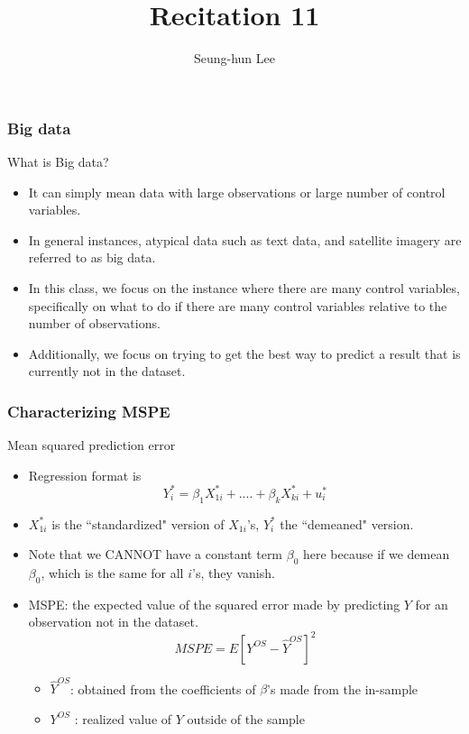 \documentclass[compress]{beamer}
\title[Recitation 11]{Recitation 11} %
\author[Seung-hun Lee]{Seung-hun Lee}
\institute[Columbia University]{Columbia University}
\date[]{}
\begin{document}
\begin{frame}
\titlepage
\end{frame}

\begin{frame}
\frametitle{Big data}
What is Big data?
\begin{itemize}
\item It can simply mean data with large observations or large number of control variables. 
\item In general instances, atypical data such as text data, and satellite imagery are referred to as big data. 
\item In this class, we focus on the instance where there are many control variables, specifically on what to do if there are many control variables relative to the number of observations. 
\item Additionally, we focus on trying to get the best way to predict a result that is currently not in the dataset.
\end{itemize}
\end{frame}

\begin{frame}
\frametitle{Characterizing MSPE}
Mean squared prediction error
\begin{itemize}
\item Regression format is 
\[
Y_{i}^*=\beta_1X_{1i}^*+....+\beta_kX_{ki}^*+u_i^*
\]
\item  $X_{1i}^*$ is the ``standardized" version of $X_{1i}$'s, $Y^*_i$ the ``demeaned" version.
\item  Note that we CANNOT have a constant term $\beta_0$ here because if we demean $\beta_0$, which is the same for all $i$'s, they vanish. 
\item MSPE:  the expected value of the squared error made by predicting $Y$ for an observation not in the dataset.
\[
MSPE= E[Y^{OS}-\hat{Y}^{OS}]^2
\]
\begin{itemize}
\item $\hat{Y}^{OS}$: obtained from the coefficients of $\beta$'s made from the in-sample
\item $Y^{OS}$ : realized value of $Y$ outside of the sample
\end{itemize}
\end{itemize}
\end{frame}
\end{document}
